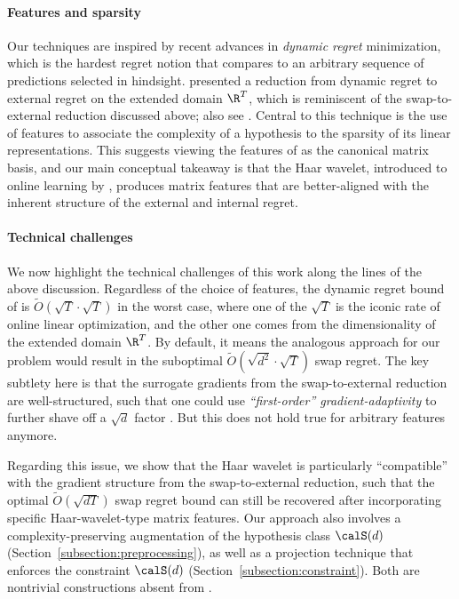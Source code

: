 \paragraph{Features and sparsity} Our techniques are inspired by recent advances in \emph{dynamic regret} minimization, which is the hardest regret notion that compares to an arbitrary sequence of predictions selected in hindsight. \cite{zhang2023unconstrained} presented a reduction from dynamic regret to external regret on the extended domain $\R^T$, which is reminiscent of the swap-to-external reduction discussed above; also see \citep{jacobsen2024equivalence}. Central to this technique is the use of features to associate the complexity of a hypothesis to the sparsity of its linear representations. This suggests viewing the features of \citep{blum2007external} as the canonical matrix basis, and our main conceptual takeaway is that the Haar wavelet, introduced to online learning by \cite{baby2019online}, produces matrix features that are better-aligned with the inherent structure of the external and internal regret. 

\paragraph{Technical challenges} We now highlight the technical challenges of this work along the lines of the above discussion. Regardless of the choice of features, the dynamic regret bound of \cite{zhang2023unconstrained} is $\tilde O(\sqrt{T}\cdot\sqrt{T})$ in the worst case, where one of the $\sqrt{T}$ is the iconic rate of online linear optimization, and the other one comes from the dimensionality of the extended domain $\R^T$. By default, it means the analogous approach for our problem would result in the suboptimal $\tilde O(\sqrt{d^2}\cdot\sqrt{T})$ swap regret. The key subtlety here is that the surrogate gradients from the swap-to-external reduction are well-structured, such that one could use \emph{``first-order'' gradient-adaptivity} to further shave off a $\sqrt{d}$ factor \citep{blum2007external}. But this does not hold true for arbitrary features anymore. 

Regarding this issue, we show that the Haar wavelet is particularly ``compatible'' with the gradient structure from the swap-to-external reduction, such that the optimal $\tilde O(\sqrt{dT})$ swap regret bound can still be recovered after incorporating specific Haar-wavelet-type matrix features. Our approach also involves a complexity-preserving augmentation of the hypothesis class $\calS(d)$ (Section~\ref{subsection:preprocessing}), as well as a projection technique that enforces the constraint $\calS(d)$ (Section~\ref{subsection:constraint}). Both are nontrivial constructions absent from \citep{zhang2023unconstrained}.